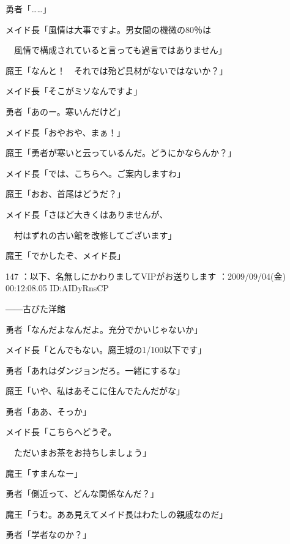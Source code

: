 \documentclass[a4j,twocolumn]{tarticle}
\begin{document}
勇者「……」 



メイド長「風情は大事ですよ。男女間の機微の80％は\par{} 
　風情で構成されていると言っても過言ではありません」\par{} 
魔王「なんと！　それでは殆ど具材がないではないか？」\par{} 
メイド長「そこがミソなんですよ」 



勇者「あのー。寒いんだけど」 



メイド長「おやおや、まぁ！」\par{} 
魔王「勇者が寒いと云っているんだ。どうにかならんか？」 



メイド長「では、こちらへ。ご案内しますわ」\par{} 
魔王「おお、首尾はどうだ？」 



メイド長「さほど大きくはありませんが、\par{} 
　村はずれの古い館を改修してございます」 



魔王「でかしたぞ、メイド長」 

	
    
    

147 ：以下、名無しにかわりましてVIPがお送りします ：2009/09/04(金) 00:12:08.05 ID:AIDyRnsCP 


――古びた洋館 



勇者「なんだよなんだよ。充分でかいじゃないか」\par{} 
メイド長「とんでもない。魔王城の1/100以下です」 



勇者「あれはダンジョンだろ。一緒にするな」\par{} 
魔王「いや、私はあそこに住んでたんだがな」\par{} 
勇者「ああ、そっか」 



メイド長「こちらへどうぞ。\par{} 
　ただいまお茶をお持ちしましょう」 



魔王「すまんなー」\par{} 
勇者「側近って、どんな関係なんだ？」 



魔王「うむ。ああ見えてメイド長はわたしの親戚なのだ」\par{} 
勇者「学者なのか？」 
\end{document}
